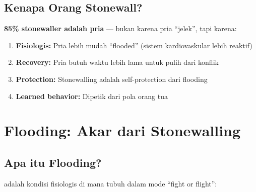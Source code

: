 \subsection{Kenapa Orang Stonewall?}

\begin{praktikbox}
\textbf{85\% stonewaller adalah pria} --- bukan karena pria ``jelek'', tapi karena:
\begin{enumerate}
    \item \textbf{Fisiologis:} Pria lebih mudah ``flooded'' (sistem kardiovaskular lebih reaktif)
    \item \textbf{Recovery:} Pria butuh waktu lebih lama untuk pulih dari konflik
    \item \textbf{Protection:} Stonewalling adalah self-protection dari flooding
    \item \textbf{Learned behavior:} Dipetik dari pola orang tua
\end{enumerate}
\end{praktikbox}

\section{Flooding: Akar dari Stonewalling}

\subsection{Apa itu Flooding?}

 adalah kondisi fisiologis di mana tubuh dalam mode ``fight or flight'':

\begin{center}
\end{center}

